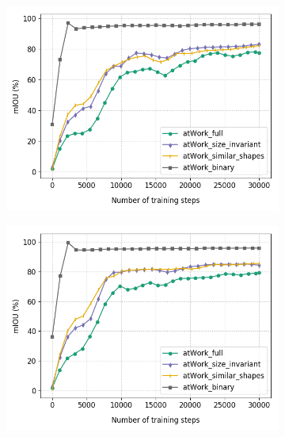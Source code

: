 	\begin{figure}
		\centering
		\begin{subfigure}{.45\textwidth}
			\centering
			\includegraphics[width=1\linewidth]{images/mobi_4vars}
			\caption{}
			\label{Fig:mobivarsa}
		\end{subfigure}
		\begin{subfigure}{.45\textwidth}
			\centering
			\includegraphics[width=1\linewidth]{images/mobi_4vars_white}
			\caption{}
			\label{Fig:mobivarsb}
		\end{subfigure}
		\begin{subfigure}{.45\textwidth}
			\centering

\end{subfigure}
\end{figure}
